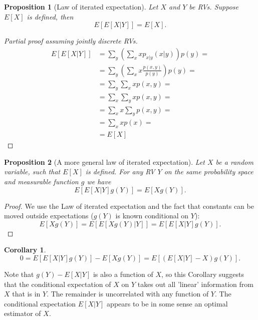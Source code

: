 \documentclass{book}
\theoremstyle{plain}%
\newtheorem{corollary}{Corollary}[section]
\newtheorem{proposition}{Proposition}[section]
\theoremstyle{definition}
\begin{document}
\begin{proposition}[Law of iterated expectation] Let $X$ and $Y$ be RVs. Suppose $E[X]$ is defined, then
$$E[E[X|Y]] = E[X].$$
\end{proposition}

\begin{proof}[Partial proof assuming jointly discrete RVs] \begin{align*}
E[E[X|Y]] &= \sum_y \left(\sum_x x p_{x|y}(x|y)\right) p(y) =\\
 &= \sum_y \left(\sum_x x \frac{p(x,y)}{p(y)}\right) p(y) =\\
 &= \sum_y \sum_x x p(x,y) =\\
 &= \sum_x \sum_y x p(x,y) =\\
  &= \sum_x x \sum_y p(x,y) =\\
  &= \sum_x x p(x) =\\
  &= E[X]
\end{align*}
\end{proof}

%
\begin{proposition}[A more general law of iterated expectation]
Let $X$ be a random variable, such that $E[X]$ is defined. For any RV $Y$ on the same probability space and measurable function $g$ we have
$$E[E[X|Y]g(Y)] = E[Xg(Y)].$$
\end{proposition}

\begin{proof}
We use the Law of iterated expectation and the fact that constants can be moved outside expectations ($g(Y)$ is known conditional on $Y$):
$$ E[Xg(Y)] = E[E[Xg(Y)|Y]] = E[E[X|Y]g(Y)].$$
\end{proof}

\begin{corollary}
$$0 = E[E[X|Y]g(Y)] - E[Xg(Y)] = E[(E[X|Y] - X)g(Y)].$$\label{cor:uncorr}
\end{corollary}

Note that $g(Y) - E[X|Y]$ is also a function of $X$, so this Corollary suggests that the conditional expectation of $X$ on $Y$ takes out all 'linear' information from $X$ that is in $Y$. The remainder is uncorrelated with any function of $Y$. The conditional expectation $E[X|Y]$ appears to be in some sense an optimal estimator of $X$.
\end{document}

